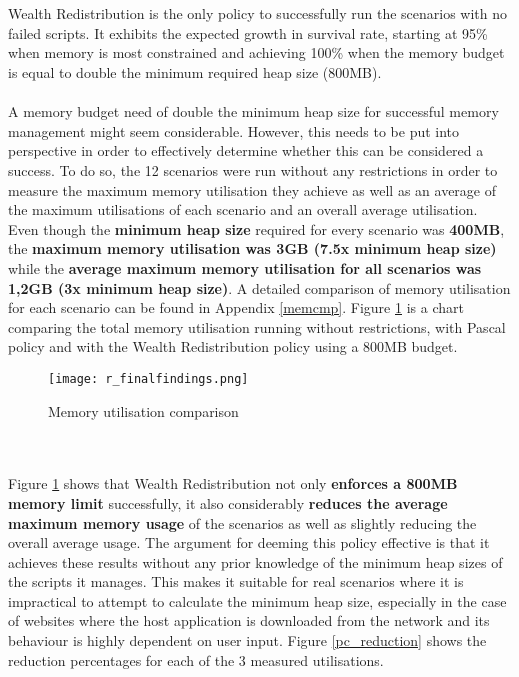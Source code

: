 \documentclass{l4proj}
\begin{document}
\\\\
\hspace*{1em} Wealth Redistribution is the only policy to successfully run the scenarios with no failed scripts. It exhibits the expected growth in survival rate, starting at 95\% when memory is most constrained and achieving 100\% when the memory budget is equal to double the minimum required heap size (800MB).
\\\\
\hspace*{1em} A memory budget need of double the minimum heap size for successful memory management might seem considerable. However, this needs to be put into perspective in order to effectively determine whether this can be considered a success. To do so, the 12 scenarios were run without any restrictions in order to measure the maximum memory utilisation they achieve as well as an average of the maximum utilisations of each scenario and an overall average utilisation. Even though the \textbf{minimum heap size} required for every scenario was \textbf{400MB}, the \textbf{maximum memory utilisation was 3GB (7.5x minimum heap size)} while the \textbf{average maximum memory utilisation for all scenarios was 1,2GB (3x minimum heap size)}. A detailed comparison of memory utilisation for each scenario can be found in Appendix \ref{memcmp}. Figure \ref{memreduction} is a chart comparing the total memory utilisation running without restrictions, with Pascal policy and with the Wealth Redistribution policy using a 800MB budget.
\begin{figure}[!ht]
  \centering
    \texttt{[image: r\_finalfindings.png]}
    \caption{Memory utilisation comparison}
    \label{memreduction}
\end{figure}
\\\\
\hspace*{1em} Figure \ref{memreduction} shows that Wealth Redistribution not only \textbf{enforces a 800MB memory limit} successfully, it also considerably \textbf{reduces the average maximum memory usage} of the scenarios as well as slightly reducing the overall average usage. The argument for deeming this policy effective is that it achieves these results without any prior knowledge of the minimum heap sizes of the scripts it manages. This makes it suitable for real scenarios where it is impractical to attempt to calculate the minimum heap size, especially in the case of websites where the host application is downloaded from the network and its behaviour is highly dependent on user input. Figure \ref{pc_reduction} shows the reduction percentages for each of the 3 measured utilisations.
\end{document}
